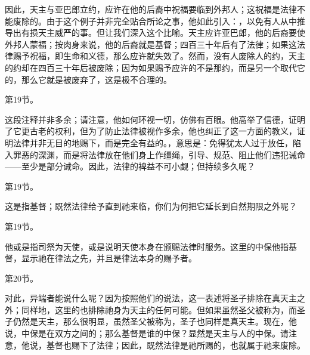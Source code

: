 因此，天主与亚巴郎立约，应许在他的后裔中祝福要临到外邦人；这祝福是法律不能废除的。由于这个例子并非完全贴合所论之事，他如此引入：，以免有人从中推导出有损天主威严的事。但让我们深入这个比喻。天主应许亚巴郎，他的后裔要使外邦人蒙福；按肉身来说，他的后裔就是基督；四百三十年后有了法律；如果这法律赐予祝福，即生命和义德，那么应许就失效了。然而，没有人废除人的约，天主的约却在四百三十年后被废除；因为如果赐予应许的不是那约，而是另一个取代它的，那么它就是被废弃了，这是极不合理的。\par

第19节。\par

这段注释并非多余；请注意，他如何环视一切，仿佛有百眼。他高举了信德，证明了它更古老的权利，但为了防止法律被视作多余，他也纠正了这一方面的教义，证明法律并非无目的地赐下，而是完全有益的。，意思是：免得犹太人过于放任，陷入罪恶的深渊，而是将法律放在他们身上作缰绳，引导、规范、阻止他们违犯诫命——至少是部分诫命。因此，法律的裨益不可小觑；但持续多久呢？\par

第19节。\par

这是指基督；既然法律给予直到祂来临，你们为何把它延长到自然期限之外呢？\par

第19节。\par

他或是指司祭为天使，或是说明天使本身在颁赐法律时服务。这里的中保他指基督，显示祂在律法之先，并且是律法本身的赐予者。\par

第20节。\par

对此，异端者能说什么呢？因为按照他们的说法，这一表述将圣子排除在真天主之外；同样地，这里的也排除祂身为天主的任何可能。但如果虽然圣父被称为，而圣子仍然是天主，那么很明显，虽然圣父被称为，圣子也同样是真天主。现在，他说，中保是在双方之间的；那么基督是谁的中保？显然是天主与人的中保。请注意，他说，基督也赐下了法律；因此，既然法律是祂所赐的，也就属于祂来废除。\par

 \par

